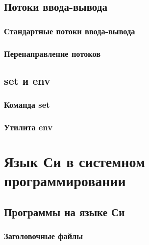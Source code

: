 \documentclass[oneside]{book}
\begin{document}
      \chapter{Потоки ввода-вывода}
      

         \section{Стандартные потоки ввода-вывода}
         

         \section{Перенаправление потоков}
         

      \chapter{set и env}

         \section{Команда set}
         

         \section{Утилита env}
         




\clearpage \part{Язык Си в системном программировании}


   \chapter{Программы на языке Си}
   

      \section{Заголовочные файлы}
      
\end{document}
